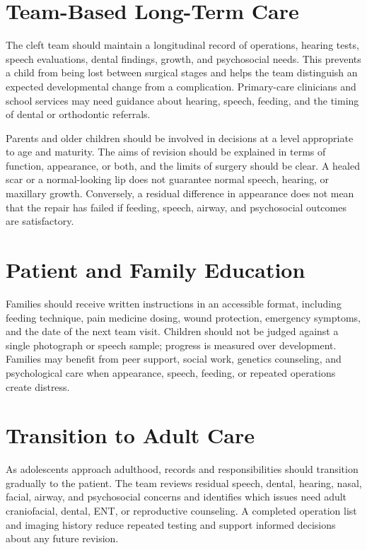 \section*{Team-Based Long-Term Care}
The cleft team should maintain a longitudinal record of operations, hearing tests, speech evaluations, dental findings, growth, and psychosocial needs. This prevents a child from being lost between surgical stages and helps the team distinguish an expected developmental change from a complication. Primary-care clinicians and school services may need guidance about hearing, speech, feeding, and the timing of dental or orthodontic referrals.

Parents and older children should be involved in decisions at a level appropriate to age and maturity. The aims of revision should be explained in terms of function, appearance, or both, and the limits of surgery should be clear. A healed scar or a normal-looking lip does not guarantee normal speech, hearing, or maxillary growth. Conversely, a residual difference in appearance does not mean that the repair has failed if feeding, speech, airway, and psychosocial outcomes are satisfactory.

\section*{Patient and Family Education}
Families should receive written instructions in an accessible format, including feeding technique, pain medicine dosing, wound protection, emergency symptoms, and the date of the next team visit. Children should not be judged against a single photograph or speech sample; progress is measured over development. Families may benefit from peer support, social work, genetics counseling, and psychological care when appearance, speech, feeding, or repeated operations create distress.

\section*{Transition to Adult Care}
As adolescents approach adulthood, records and responsibilities should transition gradually to the patient. The team reviews residual speech, dental, hearing, nasal, facial, airway, and psychosocial concerns and identifies which issues need adult craniofacial, dental, ENT, or reproductive counseling. A completed operation list and imaging history reduce repeated testing and support informed decisions about any future revision.

